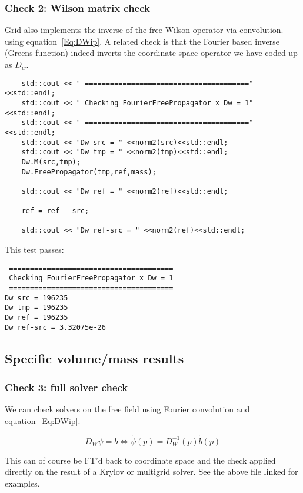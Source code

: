 \documentclass[letter,10pt]{report}
\begin{document}
\subsubsection{Check 2: Wilson matrix check}

Grid also implements the inverse of the free Wilson operator via convolution.
using equation~\ref{Eq:DWip}.
A related check is that the Fourier based inverse  (Greens function) indeed
inverts the coordinate space operator we have coded up as $D_w$.

\begin{verbatim}
    std::cout << " =======================================" <<std::endl;
    std::cout << " Checking FourierFreePropagator x Dw = 1" <<std::endl;
    std::cout << " =======================================" <<std::endl;
    std::cout << "Dw src = " <<norm2(src)<<std::endl;
    std::cout << "Dw tmp = " <<norm2(tmp)<<std::endl;
    Dw.M(src,tmp);
    Dw.FreePropagator(tmp,ref,mass);

    std::cout << "Dw ref = " <<norm2(ref)<<std::endl;
    
    ref = ref - src;
    
    std::cout << "Dw ref-src = " <<norm2(ref)<<std::endl;
\end{verbatim}

This test passes:
\begin{verbatim}
 =======================================
 Checking FourierFreePropagator x Dw = 1
 =======================================
Dw src = 196235
Dw tmp = 196235
Dw ref = 196235
Dw ref-src = 3.32075e-26
\end{verbatim}


\subsection{Specific volume/mass results}

\subsubsection{Check 3: full solver check}

We can check solvers on the free field using 
Fourier convolution and equation~\ref{Eq:DWip}.

$$
D_W \psi = b \iff \tilde\psi(p) = D_W^{-1}(p) \tilde{b}(p)
$$

This can of course be FT'd back to coordinate space and the check applied directly on the result
of a Krylov or multigrid solver. See the above file linked for examples.
\end{document}
